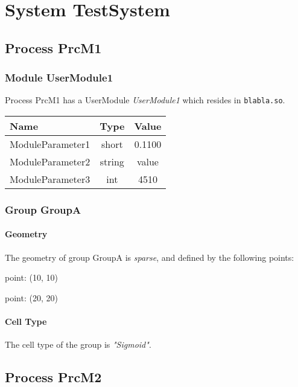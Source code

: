 \documentclass[a4paper, 11pt]{article}
\begin{document}
\section{System TestSystem}

\subsection{Process PrcM1}


\subsubsection{Module UserModule1}
Process PrcM1 has a UserModule \emph{UserModule1} which resides in
\verb!blabla.so!.

\begin{center}
\begin{tabular}{l|c|c}
Name & Type & Value\\\hline
ModuleParameter1 & short & 0.1100\\
ModuleParameter2 & string & value\\
ModuleParameter3 & int & 4510\\
\end{tabular}
\end{center}

\subsubsection{Group GroupA}
\label{sec:Group_g0}

\paragraph*{Geometry}

The geometry of group GroupA is \emph{sparse}, and defined
by the following points:
\begin{compactitem}
   \item point: (10, 10)
   \item point: (20, 20)
\end{compactitem}

\paragraph*{Cell Type}
The cell type of the group is \emph{"Sigmoid"}.

\subsection{Process PrcM2}
\end{document}
